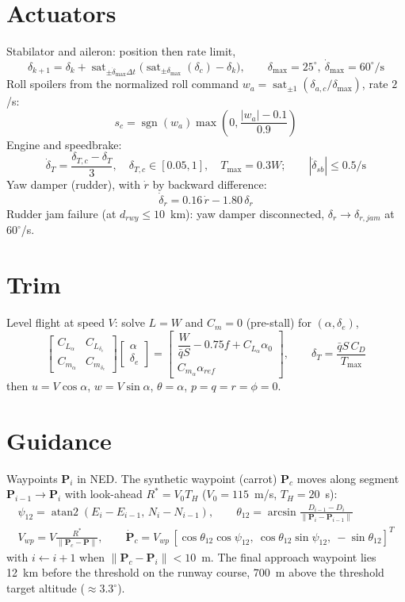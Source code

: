 \documentclass[10pt]{article}
\newcommand{\sat}{\operatorname{sat}}
\newcommand{\sgn}{\operatorname{sgn}}
\begin{document}
\section{Actuators}
Stabilator and aileron: position then rate limit,
\[
\delta_{k+1}=\delta_k+\sat_{\pm\dot\delta_{\max}\Delta t}\!\big(\sat_{\pm\delta_{\max}}(\delta_c)-\delta_k\big),\qquad
\delta_{\max}=25^\circ,\ \dot\delta_{\max}=60^\circ/\text{s}
\]
Roll spoilers from the normalized roll command $w_a=\sat_{\pm1}(\delta_{a,c}/\delta_{\max})$, rate $2$/s:
\[
s_c=\sgn(w_a)\max\!\left(0,\frac{|w_a|-0.1}{0.9}\right)
\]
Engine and speedbrake:
\[
\dot\delta_T=\frac{\delta_{T,c}-\delta_T}{3},\quad \delta_{T,c}\in[0.05,1],\quad T_{\max}=0.3W;\qquad
|\dot\delta_{sb}|\le0.5/\text{s}
\]
Yaw damper (rudder), with $\dot r$ by backward difference:
\[
\dot\delta_r = 0.16\,\dot r - 1.80\,\delta_r
\]
Rudder jam failure (at $d_{rwy}\le10$~km): yaw damper disconnected, $\delta_r\to\delta_{r,jam}$ at $60^\circ$/s.

\section{Trim}
Level flight at speed $V$: solve $L=W$ and $C_m=0$ (pre-stall) for $(\alpha,\delta_e)$,
\[
\begin{bmatrix} C_{L_\alpha} & C_{L_{\delta_e}}\\ C_{m_\alpha} & C_{m_{\delta_e}}\end{bmatrix}
\begin{bmatrix}\alpha\\ \delta_e\end{bmatrix}
=
\begin{bmatrix} \dfrac{W}{\bar qS}-0.75f+C_{L_\alpha}\alpha_0\\[4pt] C_{m_\alpha}\alpha_{ref}\end{bmatrix},
\qquad
\delta_T=\frac{\bar qS\,C_D}{T_{\max}}
\]
then $u=V\cos\alpha$, $w=V\sin\alpha$, $\theta=\alpha$, $p=q=r=\phi=0$.

\section{Guidance}
Waypoints $\mathbf{P}_i$ in NED. The synthetic waypoint (carrot) $\mathbf{P}_c$ moves along segment
$\mathbf{P}_{i-1}\to\mathbf{P}_i$ with look-ahead $R^*=V_0T_H$ ($V_0=115$~m/s, $T_H=20$~s):
\begin{gather*}
\psi_{12}=\operatorname{atan2}(E_i-E_{i-1},\,N_i-N_{i-1}),\qquad
\theta_{12}=\arcsin\!\frac{D_{i-1}-D_i}{\|\mathbf{P}_i-\mathbf{P}_{i-1}\|}\\
V_{wp}=V\frac{R^*}{\|\mathbf{P}_c-\mathbf{P}\|},\qquad
\dot{\mathbf{P}}_c=V_{wp}\,[\cos\theta_{12}\cos\psi_{12},\ \cos\theta_{12}\sin\psi_{12},\ -\sin\theta_{12}]^T
\end{gather*}
with $i\leftarrow i+1$ when $\|\mathbf{P}_c-\mathbf{P}_i\|<10$~m. The final approach waypoint lies 12~km before the
threshold on the runway course, 700~m above the threshold target altitude ($\approx3.3^\circ$).
\end{document}
